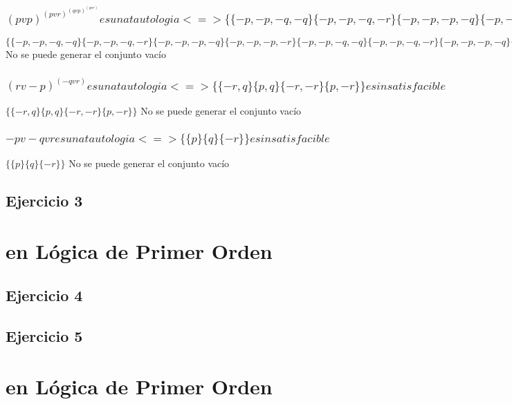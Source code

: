 \documentclass[10pt,a4paper]{article}
\begin{document}
    \subsubsection{$(p v p)^(p v r)^(q v p)^(q v r) es una tautologia <=> \{\{-p, -p, -q, -q\} \{-p, -p, -q, -r\} \{-p, -p, -p, -q\} \{-p, -p, -p, -r\} \{-p, -p, -q, -q\} \{-p, -p, -q, -r\} \{-p, -p, -p, -q\} \{-p, -p, -p, -r\} \{-p, -r, -q, -q\} \{-p, -r, -q, -r\} \{-p, -r, -p, -q\} \{-p, -r, -p, -r\} \{-p, -r, -q, -q\} \{-p, -r, -q, -r\} \{-p, -r, -p, -q\} \{-p, -r, -p, -r\}\} es insatisfacible$}
    $\{\{-p, -p, -q, -q\} \{-p, -p, -q, -r\} \{-p, -p, -p, -q\} \{-p, -p, -p, -r\} \{-p, -p, -q, -q\} \{-p, -p, -q, -r\} \{-p, -p, -p, -q\} \{-p, -p, -p, -r\} \{-p, -r, -q, -q\} \{-p, -r, -q, -r\} \{-p, -r, -p, -q\} \{-p, -r, -p, -r\} \{-p, -r, -q, -q\} \{-p, -r, -q, -r\} \{-p, -r, -p, -q\} \{-p, -r, -p, -r\}\}$
    No se puede generar el conjunto vacío

    \subsubsection{$(r v -p)^(-q v r) es una tautologia <=> \{\{-r, q\} \{p, q\} \{-r, -r\} \{p, -r\}\} es insatisfacible$}
    $\{\{-r, q\} \{p, q\} \{-r, -r\} \{p, -r\}\}$
    No se puede generar el conjunto vacío

    \subsubsection{$-p v -q v r es una tautologia <=> \{\{p\} \{q\} \{-r\}\} es insatisfacible$}
    $\{\{p\} \{q\} \{-r\}\}$
    No se puede generar el conjunto vacío
  \subsection{Ejercicio 3}
  \section*{ en Lógica de Primer Orden}
  \subsection{Ejercicio 4}
  \subsection{Ejercicio 5}
  \section*{ en Lógica de Primer Orden}
\end{document}
